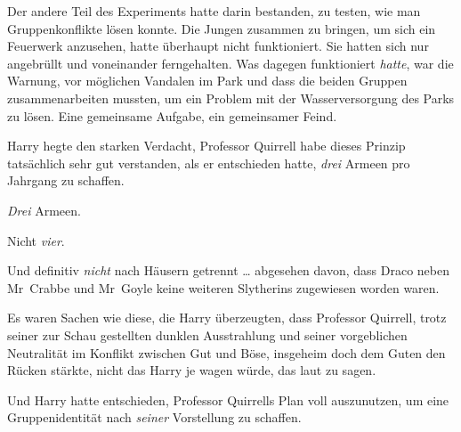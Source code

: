 Der andere Teil des Experiments hatte darin bestanden, zu testen, wie man Gruppenkonflikte lösen konnte. Die Jungen zusammen zu bringen, um sich ein Feuerwerk anzusehen, hatte überhaupt nicht funktioniert. Sie hatten sich nur angebrüllt und voneinander ferngehalten. Was dagegen funktioniert \emph{hatte}, war die Warnung, vor möglichen Vandalen im Park und dass die beiden Gruppen zusammenarbeiten mussten, um ein Problem mit der Wasserversorgung des Parks zu lösen. Eine gemeinsame Aufgabe, ein gemeinsamer Feind.

Harry hegte den starken Verdacht, Professor Quirrell habe dieses Prinzip tatsächlich sehr gut verstanden, als er entschieden hatte, \emph{drei} Armeen pro Jahrgang zu schaffen.

\emph{Drei} Armeen.

Nicht \emph{vier}.

Und definitiv \emph{nicht} nach Häusern getrennt … abgesehen davon, dass Draco neben Mr~Crabbe und Mr~Goyle keine weiteren Slytherins zugewiesen worden waren.

Es waren Sachen wie diese, die Harry überzeugten, dass Professor Quirrell, trotz seiner zur Schau gestellten dunklen Ausstrahlung und seiner vorgeblichen Neutralität im Konflikt zwischen Gut und Böse, insgeheim doch dem Guten den Rücken stärkte, nicht das Harry je wagen würde, das laut zu sagen.

Und Harry hatte entschieden, Professor Quirrells Plan voll auszunutzen, um eine Gruppenidentität nach \emph{seiner} Vorstellung zu schaffen.

